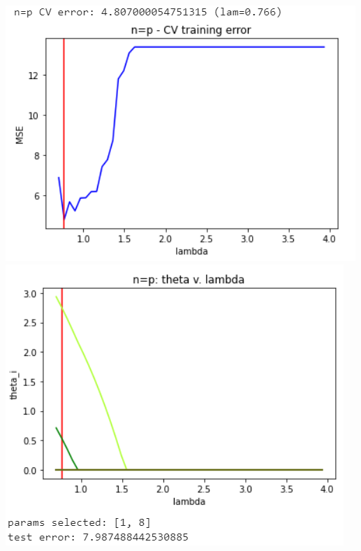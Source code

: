 \documentclass[11pt]{article}
\begin{document}
\begin{center}
\includegraphics[scale=0.7]{charts/ridge_exp_ortho_n_eq_p_err.PNG}
\includegraphics[scale=0.7]{charts/ridge_exp_ortho_n_eq_p_thetas.PNG}


\end{center}
\end{document}
